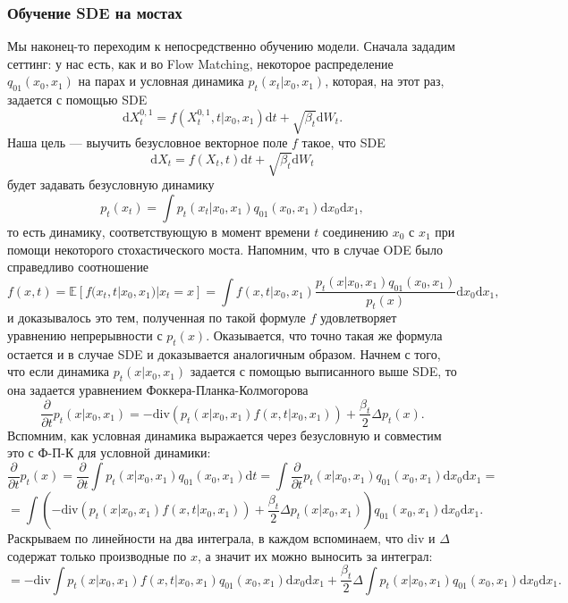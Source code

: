 \documentclass[12pt]{article}
\theoremstyle{definition}
\begin{document}
\subsubsection{Обучение SDE на мостах}
Мы наконец-то переходим к непосредственно обучению модели. Сначала зададим сеттинг: у нас есть, как и во Flow Matching, некоторое распределение $q_{01}(x_0, x_1)$ на парах и условная динамика $p_t(x_t | x_0, x_1)$, которая, на этот раз, задается с помощью SDE
\[
    \mathrm{d} X_t^{0, 1} = f(X_t^{0, 1}, t | x_0, x_1) \mathrm{d} t + \sqrt{\beta_t} \mathrm{d} W_t.
\]
Наша цель --- выучить безусловное векторное поле $f$ такое, что SDE
\[
    \mathrm{d} X_t = f(X_t, t) \mathrm{d} t + \sqrt{\beta_t} \mathrm{d} W_t
\]
будет задавать безусловную динамику
\[
    p_t(x_t) = \int p_t(x_t | x_0, x_1) q_{01}(x_0, x_1) \mathrm{d}x_0 \mathrm{d}x_1,
\]
то есть динамику, соответствующую в момент времени $t$ соединению $x_0$ с $x_1$ при помощи некоторого стохастического моста. Напомним, что в случае ODE было справедливо соотношение
\[
    f(x, t) = \mathbb{E}\left[f(x_t, t | x_0, x_1) | x_t = x \right] = \int f(x, t | x_0, x_1) \frac{p_t(x | x_0, x_1)q_{01}(x_0, x_1)}{p_t(x)} \mathrm{d} x_0 \mathrm{d} x_1,
\]
и доказывалось это тем, полученная по такой формуле $f$ удовлетворяет уравнению непрерывности с $p_t(x)$. Оказывается, что точно такая же формула остается и в случае SDE и доказывается аналогичным образом. Начнем с того, что если динамика $p_t(x | x_0, x_1)$ задается с помощью выписанного выше SDE, то она задается уравнением Фоккера-Планка-Колмогорова
\[
    \frac{\partial}{\partial t} p_t(x | x_0, x_1) = - \text{div} \left(p_t(x | x_0, x_1) f(x, t | x_0, x_1) \right) + \frac{\beta_t}{2} \Delta p_t(x).
\]
Вспомним, как условная динамика выражается через безусловную и совместим это с Ф-П-К для условной динамики:
\[
    \frac{\partial}{\partial t}p_t(x) = \frac{\partial}{\partial t} \int p_t(x | x_0, x_1) q_{01}(x_0, x_1) \mathrm{d} t = \int  \frac{\partial}{\partial t} p_t(x | x_0, x_1) q_{01}(x_0, x_1) \mathrm{d}x_0 \mathrm{d}x_1 = 
\]
\[
    = \int \left(- \text{div}\left(p_t(x | x_0, x_1) f(x, t | x_0, x_1) \right) + \frac{\beta_t}{2} \Delta p_t(x | x_0, x_1) \right) q_{01}(x_0, x_1)\mathrm{d}x_0\mathrm{d}x_1.
\]
Раскрываем по линейности на два интеграла, в каждом вспоминаем, что $\text{div}$ и $\Delta$ содержат только производные по $x$, а значит их можно выносить за интеграл:
\[
    = -\text{div}\int p_t(x | x_0, x_1) f(x, t | x_0, x_1) q_{01}(x_0, x_1) \mathrm{d} x_0 \mathrm{d} x_1 + \frac{\beta_t}{2} \Delta \int p_t(x | x_0, x_1) q_{01}(x_0, x_1) \mathrm{d} x_0 \mathrm{d} x_1.
\]
\end{document}
